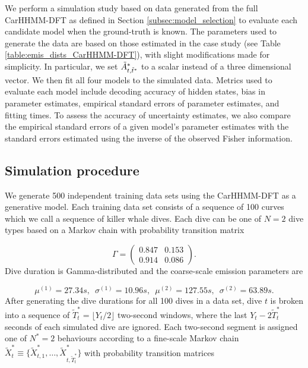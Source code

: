 
We perform a simulation study based on data generated from the full CarHHMM-DFT as defined in Section \ref{subsec:model_selection} to evaluate each candidate model when the ground-truth is known. The parameters used to generate the data are based on those estimated in the case study (see Table \ref{table:emis_dists_CarHHMM-DFT}), with slight modifications made for simplicity. In particular, we set $\tilde{A}^*_{t,\tilde t^*}$ to a scalar instead of a three dimensional vector. We then fit all four models to the simulated data. Metrics used to evaluate each model include decoding accuracy of hidden states, bias in parameter estimates, empirical standard errors of parameter estimates, and fitting times. To assess the accuracy of uncertainty estimates, we also compare the empirical standard errors of a given model's parameter estimates with the standard errors estimated using the inverse of the observed Fisher information.

\subsection{Simulation procedure}
\label{subsec:data_simulation}

We generate 500 independent training data sets using the CarHHMM-DFT as a generative model. Each training data set consists of a sequence of 100 curves which we call a sequence of killer whale dives. Each dive can be one of $N=2$ dive types based on a Markov chain with probability transition matrix

\[\Gamma = \begin{pmatrix} 0.847 & 0.153 \\ 0.914 & 0.086 \end{pmatrix}.\]
%
Dive duration is Gamma-distributed and the coarse-scale emission parameters are 

\[\mu^{(1)} = 27.34s, \enspace \sigma^{(1)} = 10.96s, \enspace \mu^{(2)} = 127.55s, \enspace \sigma^{(2)} = 63.89s.\]
%
After generating the dive durations for all 100 dives in a data set, dive $t$ is broken into a sequence of $\tilde T^*_t = \lfloor Y_t/2 \rfloor$ two-second windows, where the last $Y_t - 2 \tilde T^*_t$ seconds of each simulated dive are ignored. Each two-second segment is assigned one of $N^*=2$ behaviours according to a fine-scale Markov chain $\tilde X^*_t \equiv \big\{\tilde X^*_{t,1}, \ldots, \tilde X^*_{t,\tilde T^*_t} \big\}$ with probability transition matrices

